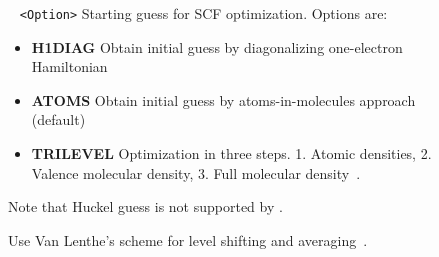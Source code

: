 \begin{description}
\item[] \verb| | \newline
\verb|<Option>|\newline
Starting guess for SCF optimization. Options are:
\begin{itemize}
\item {\bf H1DIAG} Obtain initial guess by diagonalizing one-electron Hamiltonian
\item {\bf ATOMS}  Obtain initial guess by atoms-in-molecules approach (default)
\item {\bf TRILEVEL} Optimization in three steps. 1. Atomic densities, 2. Valence molecular density, 3. Full molecular density~\cite{trilevel1, trilevel2}. 
\end{itemize}
Note that Huckel guess is not supported by \lsdalton.
\item[] Use Van Lenthe's scheme for level shifting and averaging~\cite{VanLenthe}.


\end{description}
